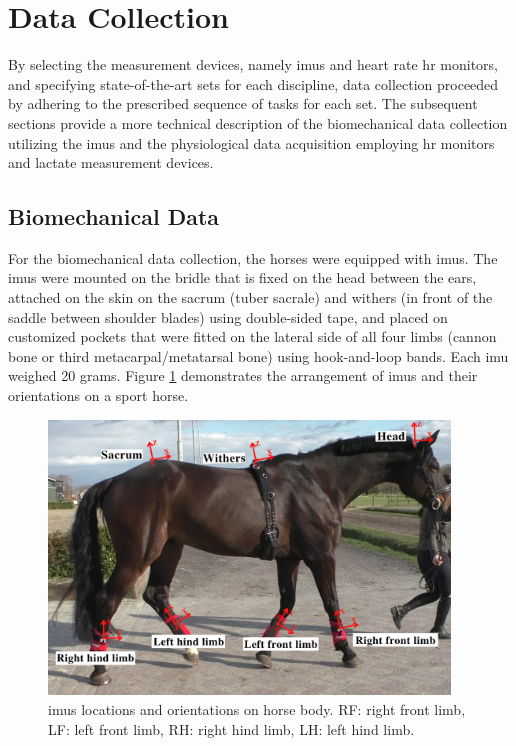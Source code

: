 \section{Data Collection}
By selecting the measurement devices, namely \gls{imu}s and heart rate \gls{hr} monitors, and specifying state-of-the-art \gls{set}s for each discipline, data collection proceeded by adhering to the prescribed sequence of tasks for each \gls{set}. The subsequent sections provide a more technical description of the biomechanical data collection utilizing the \gls{imu}s and the physiological data acquisition employing \gls{hr} monitors and lactate measurement devices.


\subsection{Biomechanical Data}
For the biomechanical data collection, the horses were equipped with \gls{imu}s. The \gls{imu}s \cite{456} were mounted on the bridle that is fixed on the head between the ears, attached on the skin on the sacrum (tuber sacrale) and withers (in front of the saddle between shoulder blades) using double-sided tape, and placed on customized pockets that were fitted on the lateral side of all four limbs (cannon bone or third metacarpal/metatarsal bone) using hook-and-loop bands. Each \gls{imu} weighed 20 grams. Figure \ref{imuplacementsporthorse} demonstrates the arrangement of \gls{imu}s and their orientations on a sport horse.

\begin{figure}[!htb]
\centering
\includegraphics[width=0.95\textwidth]{chapters/data/figures/Sacrum.png}
\caption{{{\gls{imu}s locations and orientations on horse body.} RF: right front limb, LF: left front limb,
RH: right hind limb, LH: left hind limb.}}
\label{imuplacementsporthorse}
\end{figure}

